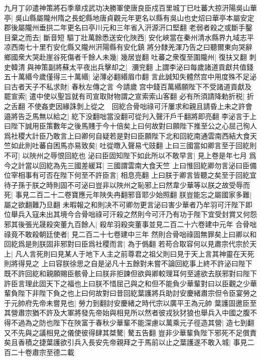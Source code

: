 九月丁卯遣神策將石季章戍武功决勝軍使唐良臣戍百里城丁巳吐蕃大掠汧陽吳山華亭|{
	吳山縣屬隴州隋之長蛇縣地唐貞觀元年更名以縣有吳山也史炤曰華亭本屬安定郡後屬隴州垂拱二年更名曰亭川元和三年省入汧源汧口堅翻}
老弱者殺之或斷手鑿目棄之而去|{
	斷音短}
驅丁壯萬餘悉送安化陜西|{
	安化峽當在秦州清水縣界九域志平凉西南七十里冇安化縣又隴州汧陽縣有安化鎮}
將分隸羌渾乃告之曰聽爾東向哭辭鄉國衆大哭赴崖谷死傷者千餘人未幾|{
	幾居豈翻}
吐蕃之衆復至圍隴州|{
	復扶又翻}
刺史韓清與神策副將蘇太平夜出兵擊却之|{
	瀰兖翻}
上謂李泌曰每歲諸道貢獻共值錢五十萬緡今歲僅得三十萬緡|{
	泌薄必翻緡眉巾翻}
言此誠知失體然宫中用度殊不足泌曰古者天子不私求財|{
	春秋左傳之言}
今請歲宫中錢百萬緡願陛下不受諸道貢獻及罷宣索|{
	遣中使以聖旨就有司宣取財物謂之宣索索山客翻}
必有所須請降勅折税|{
	折之舌翻}
不使姦吏因緣誅剝上從之　回紇合骨咄祿可汗屢求和親且請昏上未之許會邉將告乏馬無以給之|{
	紇下没翻咄當没翻可從刋入聲汗戶千翻將即亮翻}
李泌言于上曰陛下誠用臣策數年之後馬賤于今十倍矣上曰何故對曰願陛下推至公之心屈己徇人爲社稷大計臣乃敢言上曰卿何自疑若是對曰臣願陛下北和回紇南通雲南西結大食天竺如此則吐蕃自困馬亦易致矣|{
	吐從暾入聲易弋豉翻}
上曰三國當如卿言至于回紇則不可|{
	以陜州之辱恨回紇也}
泌曰臣固知陛下如此所以不敢早言|{
	見上卷是年七月}
爲今之計當以回紇為先三國差緩耳|{
	三國謂雲南大食天竺}
上曰惟回紇卿勿言泌曰臣備位宰相事有可否在陛下何至不許臣言|{
	相息亮翻}
上曰朕于卿言皆聽之矣至于回紇宜待子孫于朕之時則固不可泌曰豈非以陜州之恥邪上曰然韋少華等以朕之故受辱而死|{
	事見二百二十二卷寶應元年陜失冉翻邪音耶少始照翻}
朕豈能忘之屬國家多難|{
	屬之欲翻難乃旦翻}
未暇報之和則决不可卿勿更言泌曰害少華者乃牟羽可汗陛下即位舉兵入寇未出其境今合骨咄祿可汗殺之然則今可汗乃有功于陛下宜受封賞又何怨邪其後張光晟殺突董九百餘人|{
	殺牟羽殺突董事並見二百二十六卷建中元年}
合骨咄祿竟不敢殺朝廷使者|{
	見二百二十七卷建中三年}
然則合骨咄祿固無罪矣上曰卿以和回紇爲是則朕固非邪對曰臣爲社稷而言|{
	為于僞翻}
若苟合取容何以見肅宗代宗於天上|{
	凡人言死則曰見某人于地下人主之前尊君之祖父則曰見于天上言其神靈在天死則將得見之}
上曰容朕徐思之自是泌凡十五餘對未嘗不論回紇事上終不許泌曰陛下既不許回紇和親願賜臣骸骨上曰朕非拒諫但欲與卿較理耳何至遽欲去朕邪對曰陛下許臣言理此固天下之福也上曰朕不惜屈己與之和但不能負少華輩對曰以臣觀之少華輩負陛下非陛下負之也上曰何故對曰昔回紇葉護將兵助討安慶緒肅宗但令臣宴勞之于元帥府先帝未嘗見也|{
	勞力到翻討安慶緒之時代宗以廣平王為元帥}
葉護固邀臣至其營肅宗猶不許及大軍將發先帝始與相見所以然者彼戎狄犲狼也舉兵入中國之腹不得不過為之防也陛下在陜富于春秋少華輩不能深慮以萬乘元子徑造其營|{
	造七到翻}
又不先與之議相見之儀使彼得肆其桀驁|{
	驁五告翻}
豈非少華輩負陛下邪死不足償責矣且香積之捷葉護欲引兵入長安先帝親拜之于馬前以止之葉護遂不敢入城|{
	事見二百二十卷肅宗至德二載}

